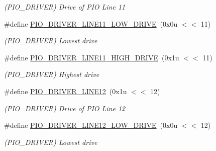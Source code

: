 \begin{DoxyCompactItemize}
\begin{DoxyCompactList}\small\item\em (P\+I\+O\+\_\+\+D\+R\+I\+V\+ER) Drive of P\+IO Line 11 \end{DoxyCompactList}\item 
\mbox{\label{group__SAME70__PIO_ga36c4f41409bea340a44b854cc93f6329}} 
\#define \mbox{\hyperlink{group__SAME70__PIO_ga36c4f41409bea340a44b854cc93f6329}{P\+I\+O\+\_\+\+D\+R\+I\+V\+E\+R\+\_\+\+L\+I\+N\+E11\+\_\+\+L\+O\+W\+\_\+\+D\+R\+I\+VE}}~(0x0u $<$$<$ 11)
\begin{DoxyCompactList}\small\item\em (P\+I\+O\+\_\+\+D\+R\+I\+V\+ER) Lowest drive \end{DoxyCompactList}\item 
\mbox{\label{group__SAME70__PIO_gae68e39271c5bc9b708370363b6d3cc95}} 
\#define \mbox{\hyperlink{group__SAME70__PIO_gae68e39271c5bc9b708370363b6d3cc95}{P\+I\+O\+\_\+\+D\+R\+I\+V\+E\+R\+\_\+\+L\+I\+N\+E11\+\_\+\+H\+I\+G\+H\+\_\+\+D\+R\+I\+VE}}~(0x1u $<$$<$ 11)
\begin{DoxyCompactList}\small\item\em (P\+I\+O\+\_\+\+D\+R\+I\+V\+ER) Highest drive \end{DoxyCompactList}\item 
\mbox{\label{group__SAME70__PIO_ga642d9d0ecb5d5714014a793518fe14fd}} 
\#define \mbox{\hyperlink{group__SAME70__PIO_ga642d9d0ecb5d5714014a793518fe14fd}{P\+I\+O\+\_\+\+D\+R\+I\+V\+E\+R\+\_\+\+L\+I\+N\+E12}}~(0x1u $<$$<$ 12)
\begin{DoxyCompactList}\small\item\em (P\+I\+O\+\_\+\+D\+R\+I\+V\+ER) Drive of P\+IO Line 12 \end{DoxyCompactList}\item 
\mbox{\label{group__SAME70__PIO_gab11cbc9448ce0cedeba18546d346dc7f}} 
\#define \mbox{\hyperlink{group__SAME70__PIO_gab11cbc9448ce0cedeba18546d346dc7f}{P\+I\+O\+\_\+\+D\+R\+I\+V\+E\+R\+\_\+\+L\+I\+N\+E12\+\_\+\+L\+O\+W\+\_\+\+D\+R\+I\+VE}}~(0x0u $<$$<$ 12)
\begin{DoxyCompactList}\small\item\em (P\+I\+O\+\_\+\+D\+R\+I\+V\+ER) Lowest drive \end{DoxyCompactList}\item 

\end{DoxyCompactItemize}
